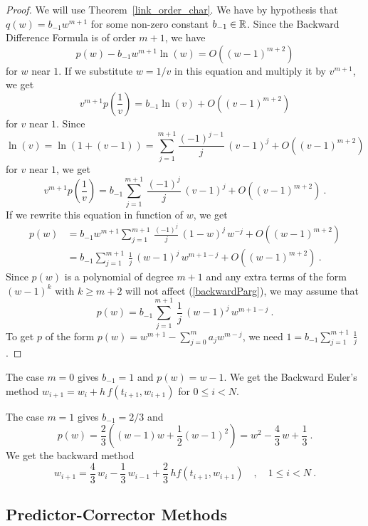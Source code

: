 \begin{proof}
We will use Theorem~\ref{link_order_char}.  We have by hypothesis that
$q(w) = b_{-1} w^{m+1}$ for some non-zero constant $b_{-1} \in \mathbb{R}$.  
Since the Backward Difference Formula is of order $m+1$, we have
\begin{equation} \label{backwardParg}
p(w) - b_{-1} w^{m+1} \ln(w) = O((w-1)^{m+2})
\end{equation}
for $w$ near $1$.  If we substitute $w=1/v$ in this equation and
multiply it by $v^{m+1}$, we get
\[
v^{m+1}p\left(\frac{1}{v}\right) = b_{-1} \ln(v) + O((v-1)^{m+2})
\]
for $v$ near $1$.  Since
\[
\ln(v) = \ln(1+(v-1)) = \sum_{j=1}^{m+1} \frac{(-1)^{j-1}}{j}\,(v-1)^j +
O((v-1)^{m+2})
\]
for $v$ near $1$, we get
\[
v^{m+1} p\left(\frac{1}{v}\right) =
b_{-1} \sum_{j=1}^{m+1}\,\frac{(-1)^j}{j}\,(v-1)^j + O((v-1)^{m+2}) \ .
\]
If we rewrite this equation in function of $w$, we get
\begin{align*}
p(w) &= b_{-1} w^{m+1} \sum_{j=1}^{m+1}\,\frac{(-1)^j}{j}\,(1-w)^j\,w^{-j} +
O((w-1)^{m+2}) \\
&= b_{-1} \sum_{j=1}^{m+1}\,\frac{1}{j}\,(w-1)^j\,w^{m+1-j} +
O((w-1)^{m+2})  \ .
\end{align*}
Since $p(w)$ is a polynomial of degree $m+1$ and any extra terms
of the form $(w-1)^k$ with $k\geq m+2$ will not affect
(\ref{backwardParg}), we may assume that
\[
p(w) = b_{-1} \sum_{j=1}^{m+1}\,\frac{1}{j}\,(w-1)^j\,w^{m+1-j} \ .
\]
To get $p$ of the form
$\displaystyle p(w) = w^{m+1} - \sum_{j=0}^m a_j w^{m-j}$, we need
$\displaystyle 1 = b_{-1} \sum_{j=1}^{m+1}\,\frac{1}{j}$.
\end{proof}

\begin{egg}
The case $m=0$ gives $b_{-1} = 1$ and $p(w) = w -1$.  We get the 
Backward Euler's method $w_{i+1} = w_i + h\,f(t_{i+1},w_{i+1})$ for
$0 \leq i < N$.

The case $m=1$ gives $b_{-1} = 2/3$ and
\[
p(w) = \frac{2}{3} \left( (w-1)w + \frac{1}{2} (w-1)^2\right)
= w^2 - \frac{4}{3}\, w + \frac{1}{3} \ .
\]
We get the backward method
\[
w_{i+1} = \frac{4}{3}\, w_i - \frac{1}{3} \, w_{i-1}
+ \frac{2}{3}\,h f(t_{i+1},w_{i+1}) \quad, \quad 1 \leq i < N \ .
\]
\end{egg}

\subsection{Predictor-Corrector Methods}

